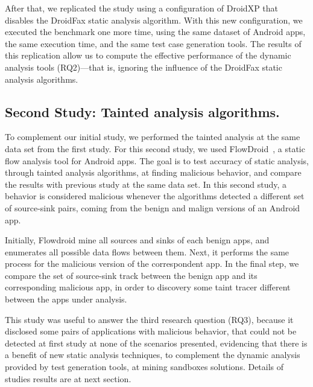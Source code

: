 

After that, we replicated the study using a configuration of DroidXP that
disables the DroidFax static analysis algorithm. With this new configuration,
we executed the benchmark one more time, using the same dataset of Android
apps, the same execution time, and the same test case generation tools.
The results of this replication allow us to compute the effective performance
of the dynamic analysis tools (RQ2)---that is, ignoring the influence of the
DroidFax static analysis algorithms.

\subsection{Second Study: Tainted analysis algorithms.}

To complement our initial study, we performed the tainted analysis at the same
data set from the first study. For this second study, we used
FlowDroid~\cite{10.1145/2666356.2594299}, a static flow analysis tool for Android apps.
The goal is to test accuracy of static analysis, through tainted analysis algorithms, at finding malicious behavior, and compare the results with previous study at the same data set.
In this second study, a behavior is considered malicious whenever the algorithms
detected a different set of source-sink pairs, coming from the benign and malign
versions of an Android app. 

Initially, Flowdroid mine all sources and sinks of each benign apps, and enumerates all possible data flows between them. Next, it performs the same process for the malicious version
of the correspondent app. In the final step, we compare the set of source-sink track between the benign app and its corresponding malicious app, in order to discovery some taint tracer different between the apps under analysis.

This study was useful to answer the third research question (RQ3), because it disclosed some pairs of applications with malicious behavior, that could not be detected at first study at none of the scenarios presented, evidencing that there is a benefit of new static analysis techniques, to complement the dynamic analysis provided by test generation tools, at mining sandboxes solutions. Details of studies results are at next section.





